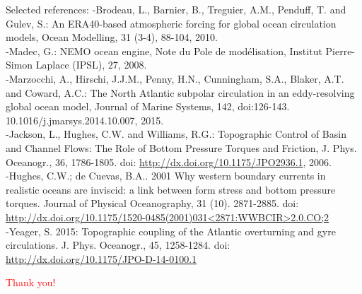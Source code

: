 \documentclass{beamer}
\begin{document}
\begin{frame}{Selected references:}
\tiny
-Brodeau, L., Barnier, B., Treguier, A.M., Penduff, T. and Gulev, S.: An ERA40-based atmospheric forcing for global ocean circulation models, Ocean Modelling, 31 (3-4), 88-104, 2010.\\
-Madec, G.: NEMO ocean engine, Note du Pole de modélisation, Institut Pierre-Simon Laplace (IPSL), 27, 2008.\\
-Marzocchi, A., Hirschi, J.J.M., Penny, H.N., Cunningham, S.A., Blaker, A.T. and Coward, A.C.: The North Atlantic subpolar circulation in an eddy-resolving global ocean model, Journal of Marine Systems, 142, doi:126-143. 10.1016/j.jmarsys.2014.10.007, 2015.\\
-Jackson, L., Hughes, C.W. and Williams, R.G.: Topographic Control of Basin and Channel Flows: The Role of Bottom Pressure Torques and Friction, J. Phys. Oceanogr., 36, 1786-1805. doi: \url{http://dx.doi.org/10.1175/JPO2936.1}, 2006.\\
-Hughes, C.W.; de Cuevas, B.A.. 2001 Why western boundary currents in realistic oceans are inviscid: a link between form stress and bottom pressure torques. Journal of Physical Oceanography, 31 (10). 2871-2885. doi: \url{http://dx.doi.org/10.1175/1520-0485(2001)031<2871:WWBCIR>2.0.CO;2}\\
-Yeager, S. 2015: Topographic coupling of the Atlantic overturning and gyre circulations. J. Phys. Oceanogr., 45, 1258-1284. doi: \url{http://dx.doi.org/10.1175/JPO-D-14-0100.1}\\

\pause
\vspace{20}
\huge
\begin{centering}
\centering \textcolor{red}{Thank you!}
\end{centering} 

\end{frame}



% 
% 
% 
% 
% 
\end{document}
